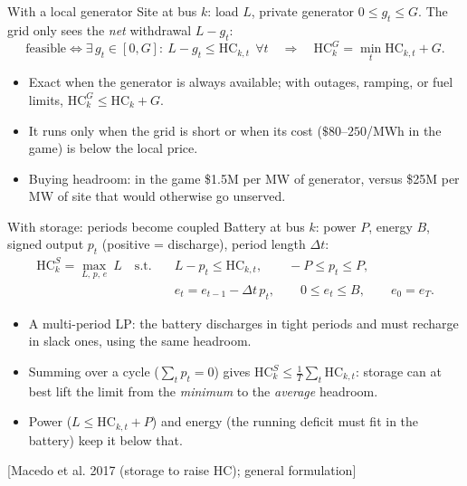 \documentclass[aspectratio=169,11pt]{beamer}
\newcommand{\HC}{\ensuremath{\mathrm{HC}}}
\newcommand{\src}[1]{{\scriptsize\color{PurdueSteel}[#1]}}
\begin{document}
\begin{frame}{With a local generator}
  Site at bus $k$: load $L$, private generator $0\le g_t\le G$. The grid only
  sees the \emph{net} withdrawal $L-g_t$:
  \[
    \text{feasible} \iff \exists\, g_t\in[0,G]:\ L - g_t \le \HC_{k,t}\ \ \forall t
    \quad\Longrightarrow\quad \HC_k^{G} = \min_t \HC_{k,t} + G .
  \]
  \begin{itemize}
    \item Exact when the generator is always available; with outages, ramping,
      or fuel limits, $\HC^G_k \le \HC_k + G$.
    \item It runs only when the grid is short or when its cost
      ($\$80$--$250$/MWh in the game) is below the local price.
    \item Buying headroom: in the game \$1.5M per MW of generator, versus
      \$25M per MW of site that would otherwise go unserved.
  \end{itemize}
\end{frame}

\begin{frame}{With storage: periods become coupled}
  Battery at bus $k$: power $P$, energy $B$, signed output $p_t$
  (positive = discharge), period length $\Delta t$:
  \begin{align*}
    \HC_k^{S} = \max_{L,\,p,\,e}\ L \quad \text{s.t.}\quad
      & L - p_t \le \HC_{k,t}, \qquad -P \le p_t \le P,\\
      & e_t = e_{t-1} - \Delta t\, p_t,\qquad 0 \le e_t \le B,\qquad e_0 = e_T .
  \end{align*}
  \begin{itemize}
    \item A multi-period LP: the battery discharges in tight periods and must
      recharge in slack ones, using the same headroom.
    \item Summing over a cycle ($\sum_t p_t = 0$) gives
      $\HC^S_k \le \frac1T \sum_t \HC_{k,t}$: storage can at best lift the
      limit from the \emph{minimum} to the \emph{average} headroom.
    \item Power ($L \le \HC_{k,t} + P$) and energy (the running deficit must
      fit in the battery) keep it below that.
  \end{itemize}
  \src{Macedo et al. 2017 (storage to raise HC); general formulation}
\end{frame}
\end{document}
